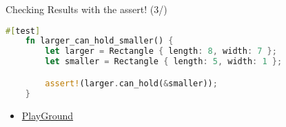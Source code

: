 \documentclass[cjk,14pt,xcolor=dvipsnames,table,dvipdfmx,professional font,t,fragile]{beamer}
\begin{document}
\begin{frame}[containsverbatim]{Checking Results with the assert! (3/)}
 \mbox{}
 {\scriptsize
 \begin{lstlisting}[language=Rust,style=boxed,style=colouredRust]
    #[test]
    fn larger_can_hold_smaller() {
        let larger = Rectangle { length: 8, width: 7 };
        let smaller = Rectangle { length: 5, width: 1 };

        assert!(larger.can_hold(&smaller));
    }\end{lstlisting}}
\begin{itemize}
 \item \href{https://play.integer32.com/?version=stable&mode=debug&edition=2018&gist=cdf6bb94826b7c2d369e3419ac251cac}
       {PlayGround}
\end{itemize}
\end{frame}
\end{document}
